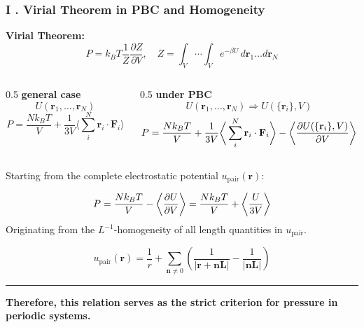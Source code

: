 \documentclass{beamer}
\begin{document}
	\begin{frame}
		\frametitle{I . Virial Theorem in PBC  and Homogeneity}    	
		\footnotesize 
		
		\textbf{Virial Theorem:}
		\begin{equation*}
			P = k_B T\dfrac{1}{Z} \dfrac{\partial Z}{\partial V} , \quad Z =  \int_{V} \cdots \int_{V} e^{-\beta U} \, d\mathbf{r}_1 \dots d\mathbf{r}_N  
		\end{equation*}
		
		
		\begin{columns}[T]
			
			
			
			\begin{column}{0.5\textwidth}
				\centering
				\textbf{general case}
				\begin{equation*}
					U(\mathbf{r}_1, \dots , \mathbf{r}_N)  
				\end{equation*}
				\begin{equation*}
					P= \dfrac{N k_B T}{ V} + \dfrac{1}{3V} \langle \sum_i^N \mathbf{r}_i \cdot \mathbf{F}_i  \rangle  \label{eq:P=Nk_BT} 
				\end{equation*}
			\end{column}%
			
			\begin{column}{0.5\textwidth}
				\centering
				\textbf{under PBC}  				
				\begin{equation*}
					U(\mathbf{r}_1, \dots , \mathbf{r}_N)  \Rightarrow  U(\{ \mathbf{r}_i \}, V)
				\end{equation*}
				\begin{equation*}
					P 
					= \dfrac{Nk_BT}{V} + \dfrac{1}{3V} \bigg{\langle}  \sum_i^N \mathbf{r}_i \cdot \mathbf{F}_i \bigg{\rangle}  - \bigg{\langle}  \dfrac{\partial U(\{ \mathbf{r}_i \}, V)}{\partial V}  \bigg{\rangle} 
				\end{equation*} 
			\end{column}%
		\end{columns} 
		
		\vspace{10pt}
		Starting from the complete electrostatic potential $u_{\text{pair}}(\mathbf{r})$:
		
		\begin{equation*}
			P = \dfrac{Nk_BT}{V} -  \bigg{\langle} \dfrac{\partial U}{\partial V} \bigg{\rangle}   = \dfrac{Nk_BT}{V} +  \bigg{\langle}  \dfrac{U}{3V} \bigg{\rangle} 
		\end{equation*}
		Originating from the $L^{-1}$-homogeneity of all length quantities in $ u_{\mathrm{pair}} $.
		
		\begin{equation*}
			u_{\text{pair}}(\mathbf{r}) = \frac{1}{r} + \sum_{\mathbf{n} \ne 0} \left( \frac{1}{|\mathbf{r} + \mathbf{nL}|} - \frac{1}{|\mathbf{nL}|} \right)
		\end{equation*}
		
		
		\noindent\rule{\textwidth}{0.4pt}
		\centering
		\small
		\textbf{Therefore, this relation serves as the strict criterion for pressure in periodic systems.} 
	\end{frame}
\end{document}
